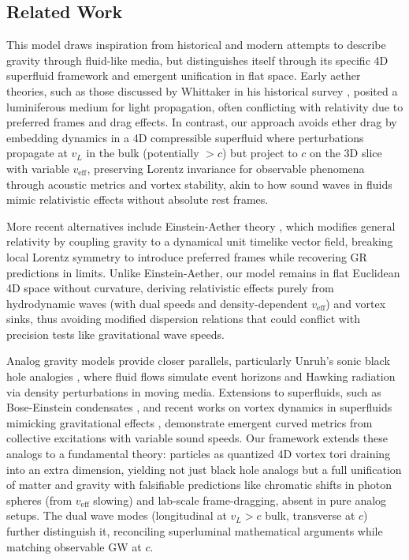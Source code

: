 \documentclass{article}
\begin{document}
\subsection{Related Work}

This model draws inspiration from historical and modern attempts to describe gravity through fluid-like media, but distinguishes itself through its specific 4D superfluid framework and emergent unification in flat space. Early aether theories, such as those discussed by Whittaker in his historical survey \cite{whittaker1951history}, posited a luminiferous medium for light propagation, often conflicting with relativity due to preferred frames and drag effects. In contrast, our approach avoids ether drag by embedding dynamics in a 4D compressible superfluid where perturbations propagate at $v_L$ in the bulk (potentially $>c$) but project to $c$ on the 3D slice with variable $v_{\text{eff}}$, preserving Lorentz invariance for observable phenomena through acoustic metrics and vortex stability, akin to how sound waves in fluids mimic relativistic effects without absolute rest frames.

More recent alternatives include Einstein-Aether theory \cite{jacobson2004einstein}, which modifies general relativity by coupling gravity to a dynamical unit timelike vector field, breaking local Lorentz symmetry to introduce preferred frames while recovering GR predictions in limits. Unlike Einstein-Aether, our model remains in flat Euclidean 4D space without curvature, deriving relativistic effects purely from hydrodynamic waves (with dual speeds and density-dependent $v_{\text{eff}}$) and vortex sinks, thus avoiding modified dispersion relations that could conflict with precision tests like gravitational wave speeds.

Analog gravity models provide closer parallels, particularly Unruh's sonic black hole analogies \cite{unruh1995sonic}, where fluid flows simulate event horizons and Hawking radiation via density perturbations in moving media. Extensions to superfluids, such as Bose-Einstein condensates \cite{garay2000sonic}, and recent works on vortex dynamics in superfluids mimicking gravitational effects \cite{simula2020gravitational, svancara2024rotating}, demonstrate emergent curved metrics from collective excitations with variable sound speeds. Our framework extends these analogs to a fundamental theory: particles as quantized 4D vortex tori draining into an extra dimension, yielding not just black hole analogs but a full unification of matter and gravity with falsifiable predictions like chromatic shifts in photon spheres (from $v_{\text{eff}}$ slowing) and lab-scale frame-dragging, absent in pure analog setups. The dual wave modes (longitudinal at $v_L > c$ bulk, transverse at $c$) further distinguish it, reconciling superluminal mathematical arguments while matching observable GW at $c$.
\end{document}
